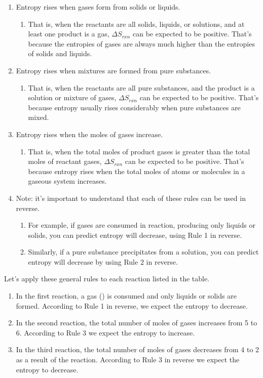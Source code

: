 \documentclass{article}  %
\begin{document}
\begin{enumerate}
    \item Entropy rises when gases form from solids or liquids.
        \begin{enumerate}
            \item That is, when the reactants are all solids, liquids, or solutions, and at least one product is a gas, $\Delta S_{rxn}$ can be expected to be positive. That's because the entropies of gases are always much higher than the entropies of solids and liquids. 
        \end{enumerate}
    \item Entropy rises when mixtures are formed from pure substances.
        \begin{enumerate}
            \item That is, when the reactants are all pure substances, and the product is a solution or mixture of gases, $\Delta S_{rxn}$ can be expected to be positive. That's because entropy usually rises considerably when pure substances are mixed.  
        \end{enumerate}
    \item Entropy rises when the moles of gases increase.
        \begin{enumerate}
            \item That is, when the total moles of product gases is greater than the total moles of reactant gases, $\Delta S_{rxn}$ can be expected to be positive. That's because entropy rises when the total moles of atoms or molecules in a gaseous system increases. 
        \end{enumerate}
    \item Note: it's important to understand that each of these rules can be used in reverse.
        \begin{enumerate}
            \item For example, if gases are consumed in reaction, producing only liquids or solids, you can predict entropy will decrease, using Rule 1 in reverse.
            \item Similarly, if a pure substance precipitates from a solution, you can predict entropy will decrease by using Rule 2 in reverse. 
        \end{enumerate}
\end{enumerate}
Let's apply these general rules to each reaction listed in the table.
\begin{enumerate}
    \item In the first reaction, a gas () is consumed and only liquids or solids are formed. According to Rule 1 in reverse, we expect the entropy to decrease.
    \item In the second reaction, the total number of moles of gases increases from 5 to 6. According to Rule 3 we expect the entropy to increase.
    \item In the third reaction, the total number of moles of gases decreases from 4 to 2 as a result of the reaction. According to Rule 3 in reverse we expect the entropy to decrease. 
\end{enumerate}
\end{document}
